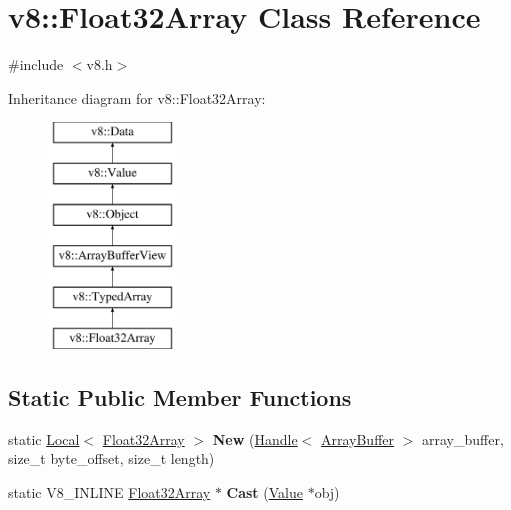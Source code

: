 \hypertarget{classv8_1_1Float32Array}{}\section{v8\+:\+:Float32\+Array Class Reference}
\label{classv8_1_1Float32Array}


{\ttfamily \#include $<$v8.\+h$>$}

Inheritance diagram for v8\+:\+:Float32\+Array\+:\begin{figure}[H]
\begin{center}
\leavevmode
\includegraphics[height=6.000000cm]{classv8_1_1Float32Array}
\end{center}
\end{figure}
\subsection*{Static Public Member Functions}
\begin{DoxyCompactItemize}
\item 
\hypertarget{classv8_1_1Float32Array_a6fea1d1987ec9abce97060900d5fc4af}{}static \hyperlink{classv8_1_1Local}{Local}$<$ \hyperlink{classv8_1_1Float32Array}{Float32\+Array} $>$ {\bfseries New} (\hyperlink{classv8_1_1Handle}{Handle}$<$ \hyperlink{classv8_1_1ArrayBuffer}{Array\+Buffer} $>$ array\+\_\+buffer, size\+\_\+t byte\+\_\+offset, size\+\_\+t length)\label{classv8_1_1Float32Array_a6fea1d1987ec9abce97060900d5fc4af}

\item 
\hypertarget{classv8_1_1Float32Array_adf926d03cacd4b3901d7f9750671a350}{}static V8\+\_\+\+I\+N\+L\+I\+N\+E \hyperlink{classv8_1_1Float32Array}{Float32\+Array} $\ast$ {\bfseries Cast} (\hyperlink{classv8_1_1Value}{Value} $\ast$obj)\label{classv8_1_1Float32Array_adf926d03cacd4b3901d7f9750671a350}

\end{DoxyCompactItemize}
